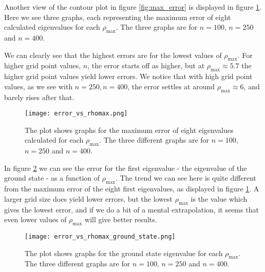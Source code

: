 \documentclass{emulateapj}
\begin{document}
        Another view of the contour plot in figure \ref{fig:max_error} is displayed in figure \ref{fig:error_vs_rhomax}. Here we see three graphs, each representing the maximum error of eight calculated eigenvalues for each $\rho_{\text{max}}$. The three graphs are for $n = 100$, $n = 250$ and $n = 400$.
        
        We can clearly see that the highest errors are for the lowest values of $\rho_{\text{max}}$. For higher grid point values, $n$, the error starts off as higher, but at $\rho_{\text{max}} \approx 5.7$ the higher grid point values yield lower errors. We notice that with high grid point values, as we see with $n = 250, n = 400$, the error settles at around $\rho_{\text{max}} \approx 6$, and barely rises after that.
        
        
        \begin{figure}[t]
            \centering
            \texttt{[image: error\_vs\_rhomax.png]}
            \caption{The plot shows graphs for the maximum error of eight eigenvalues calculated for each $\rho_{\text{max}}$. The three different graphs are for $n = 100$, $n = 250$ and $n = 400$.}
            \label{fig:error_vs_rhomax}
        \end{figure}{}
        
        In figure \ref{fig:error_vs_rhomax_ground_state} we can see the error for the first eigenvalue - the eigenvalue of the ground state - as a function of $\rho_{\text{max}}$. The trend we can see here is quite different from the maximum error of the eight first eigenvalues, as displayed in figure \ref{fig:error_vs_rhomax}. A larger grid size does yield lower errors, but the lowest $\rho_{\text{max}}$ is the value which gives the lowest error, and if we do a bit of a mental extrapolation, it seems that even lower values of $\rho_{\text{max}}$ will give better results.
        
        
        
        \begin{figure}[t]
            \centering
            \texttt{[image: error\_vs\_rhomax\_ground\_state.png]}
            \caption{The plot shows graphs for the ground state eigenvalue for each $\rho_{\text{max}}$. The three different graphs are for $n = 100$, $n = 250$ and $n = 400$.}
            \label{fig:error_vs_rhomax_ground_state}
        \end{figure}{}
        
\end{document}
